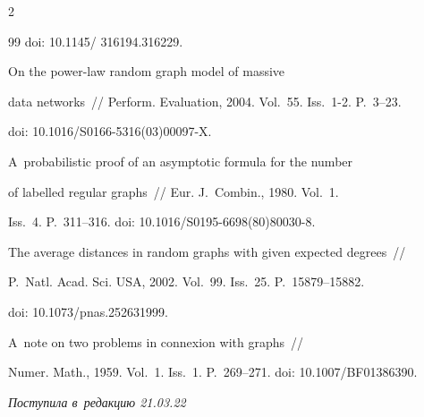\begin{multicols}{2}
{{\begin{thebibliography}{99}
doi: 10.1145/ 316194.316229.




 On the power-law random graph model of massive

data networks~// Perform. Evaluation, 2004. Vol.~55. Iss.~1-2. P.~3--23.

doi: 10.1016/S0166-5316(03)00097-X.




 A~probabilistic proof of an asymptotic formula for the number

of labelled regular graphs~// Eur. J.~Combin., 1980. Vol.~1.

Iss.~4. P.~311--316. doi: 10.1016/S0195-6698(80)80030-8.








 The average distances in random graphs with given expected degrees~// 

P.~Natl. Acad. Sci. USA, 2002. Vol.~99. Iss.~25. P.~15879--15882.

doi: 10.1073/pnas.252631999.




 A~note on two problems in connexion with graphs~// 

Numer. Math., 1959. Vol.~1. Iss.~1. P.~269--271. doi: 10.1007/BF01386390.

\end{thebibliography}



 }

 }



\end{multicols}



\vspace*{-7pt}



\hfill{\small\textit{Поступила в~редакцию 21.03.22}}









